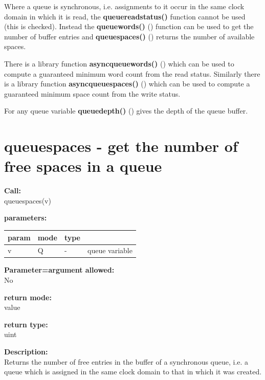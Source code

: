         Where a queue is synchronous, i.e. assignments to it occur in the same
        clock domain in which it is read, the {\bf queuereadstatus()} function
        cannot be used (this is checked). Instead the {\bf queuewords()}
        () function can be used to get the number of
        buffer entries and {\bf queuespaces()} ()
        returns the number of available spaces.
        
        There is a library function {\bf asyncqueuewords()}
        () which can be used to compute
        a guaranteed minimum word count from the read status.
        Similarly there is a library function {\bf asyncqueuespaces()}
        () which can be used to compute
        a guaranteed minimum space count from the write status.

        For any queue variable {\bf queuedepth()} () gives
        the depth of the queue buffer.


    \section{queuespaces - get the number of free spaces in a queue}\label{sec:ifqueuespaces}
        
        {\bf Call:} \\
        queuespaces(v)
        
        {\bf parameters:} \\
        \begin{tabular}{| l | l | l | l |}
        \hline
        param  & mode & type & \\
        \hline \hline
        v & Q & - & queue variable \\ \hline
        \end{tabular}
        
        {\bf Parameter=argument allowed:} \\
        No
        
        {\bf return mode:} \\
        value

        {\bf return type:} \\
        uint
        
        {\bf Description:} \\
        Returns the number of free entries in the buffer of a synchronous queue,
        i.e. a queue which is assigned in the same clock domain to that in which
        it was created.

